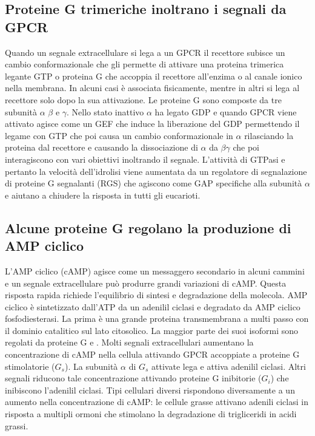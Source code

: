 \subsection{Proteine G trimeriche inoltrano i segnali da GPCR}
Quando un segnale extracellulare si lega a un GPCR il recettore subisce un cambio conformazionale che gli permette di attivare una proteina trimerica legante GTP o proteina G che 
accoppia il recettore all'enzima o al canale ionico nella membrana. In alcuni casi \`e associata fisicamente, mentre in altri si lega al recettore solo dopo la sua attivazione. Le
proteine G sono composte da tre subunit\`a $\alpha$ $\beta$ e $\gamma$. Nello stato inattivo $\alpha$ ha legato GDP e quando GPCR viene attivato agisce come un GEF che induce la
liberazione del GDP permettendo il legame con GTP che poi causa un cambio conformazionale in $\alpha$ rilasciando la proteina dal recettore e causando la dissociazione di $\alpha$
da $\beta\gamma$ che poi interagiscono con vari obiettivi inoltrando il segnale. L'attivit\`a di GTPasi e pertanto la velocit\`a dell'idrolisi viene aumentata  da un regolatore di 
segnalazione di proteine G segnalanti (RGS) che agiscono come GAP specifiche alla subunit\`a $\alpha$ e aiutano a chiudere la risposta in tutti gli eucarioti. 
\subsection{Alcune proteine G regolano la produzione di AMP ciclico}
L'AMP ciclico (cAMP) agisce come un messaggero secondario in alcuni cammini e un segnale extracellulare pu\`o produrre grandi variazioni di cAMP. Questa risposta rapida richiede 
l'equilibrio di sintesi e degradazione della molecola. AMP ciclico \`e sintetizzato dall'ATP da un adenilil ciclasi e degradato da AMP ciclico fosfodiesterasi. La prima \`e una grande 
proteina transmembrana a multi passo con il dominio catalitico sul lato citosolico. La maggior parte dei suoi isoformi sono regolati da proteine G e . Molti segnali 
extracellulari aumentano la concentrazione di cAMP nella cellula attivando GPCR accoppiate a proteine G stimolatorie ($G_s$). La subunit\`a $\alpha$ di $G_s$ attivate lega e attiva 
adenilil ciclasi. Altri segnali riducono tale concentrazione attivando proteine G inibitorie ($G_i$) che inibiscono l'adenilil ciclasi. Tipi cellulari diversi rispondono diversamente a
un aumento nella concentrazione di cAMP: le cellule grasse attivano adenili ciclasi in risposta a multipli ormoni che stimolano la degradazione di trigliceridi in acidi grassi. 
